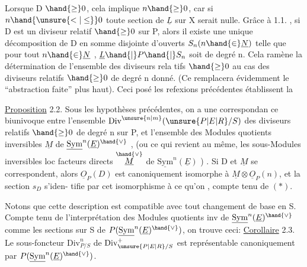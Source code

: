 
Lorsque D $\hand{\geq} 0$, cela implique $n \hand{\geq} 0$, car si  $n \hand{\unsure{<|\leq}} 0$ toute section de
$\underline{L}$ sur X serait nulle. Grâce à 1.1. , si D est un diviseur relatif
$\hand{\geq} 0$ sur P, alors il existe une unique décomposition de D en somme
disjointe d'ouverts $S_n (n \hand{\in} \underline{N})$ telle que pour tout $n \hand{\in} \underline{N}$ , $\underline{L}\hand{|}P\hand{|}S_n$ soit de
degré n. Cela ramène la détermination de l'ensemble des diviseurs rela%
tifs $\hand{\geq} 0$ au cas des diviseurs relatifs $\hand{\geq} 0$ de degré n donné. (Ce
  remplacera évidemment le ``abstraction faite'' plus haut). Ceci posé
les refexions précédentes établissent la

\uline{Proposition} 2.2. Sous les hypothèses précédentes, on a une correspondan%
ce biunivoque entre l'ensemble $\mathrm{Div}^{\unsure{n|m}}(\unsure{P|E|R}/S)$ des diviseurs relatifs $\hand{\geq} 0$ de
degré n sur P, et l'ensemble des Modules quotients inversibles $\underline{M}$ de
$\underline{\mathrm{Sym}}^{n}(\underline{E})^{\hand{\vee}}$ , (ou ce qui revient au même, les sous-Modules inversibles loc
facteurs directs $\overset{\hand{\vee}}{\underline{M}}$ de $\underline{\mathrm{Sym}}^{n}(\underline{E})$ ) . Si D et $\underline{M}$ se correspondent, alors
$\underline{O}_P(D)$ est canoniquement isomorphe à $\underline{M}\otimes\underline{O}_P(n)$, et la section $s_D$ s'iden-%
tifie par cet isomorphisme à ce qu'on , compte tenu de $(*)$.

Notons que cette description est compatible avec tout changement de
base en S. Compte tenu de l'interprétation des Modules quotients inv de
$\underline{\mathrm{Sym}}^{n}(\underline{E})^{\hand{\vee}}$ comme les sections sur S de $P(\underline{\mathrm{Sym}}^{n}(\underline{E})^{\hand{\vee}})$, on trouve ceci:
\uline{Corollaire} 2.3. Le sous-foncteur  $\mathrm{Div}^{n}_{P/S}$ de $\mathrm{Div}^{+}_{\unsure{P|E|R}/S}$ est représentable
canoniquement par $P(\underline{\mathrm{Sym}}^{n}(\underline{E})^{\hand{\vee}})$.

